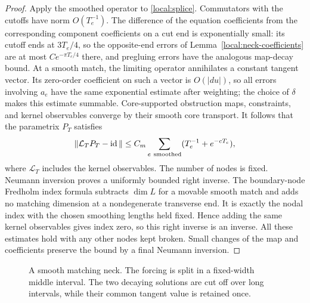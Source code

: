 \begin{proof}
Apply the smoothed operator to \eqref{local:splice}.  Commutators with
the cutoffs have norm $O(T_e^{-1})$.  The difference of the equation
coefficients from the corresponding component coefficients on a
cut end is exponentially small: its cutoff ends at $3T_e/4$, so the
opposite-end errors of Lemma~\ref{local:neck-coefficients} are at most
$Ce^{-\pi T_e/4}$ there, and pregluing errors have the analogous
map-decay bound.  At a smooth match, the limiting operator annihilates
a constant tangent vector.  Its zero-order coefficient on such a
vector is $O(|du|)$, so all errors involving $a_e$ have the same
exponential estimate after weighting; the choice of $\delta$ makes
this estimate summable.  Core-supported obstruction maps, constraints,
and kernel observables converge by their smooth core transport.
It follows that the parametrix $P_T$ satisfies
\begin{equation}\label{local:parametrix-error}
 \|\mathcal L_TP_T-\operatorname{id}\|
   \leq C_m\sum_{e\ \mathrm{smoothed}}
                      (T_e^{-1}+e^{-cT_e}),
\end{equation}
where $\mathcal L_T$ includes the kernel observables.  The number of
nodes is fixed.  Neumann inversion proves a uniformly bounded right
inverse.  The boundary-node Fredholm index formula subtracts
$\dim L$ for a movable smooth match and adds no matching dimension
at a nondegenerate transverse end.  It is exactly the nodal index
with the chosen smoothing lengths held fixed.  Hence adding the
same kernel observables gives index zero, so this right inverse is
an inverse.  All these estimates hold with any other nodes kept
broken.  Small changes of the map and coefficients preserve the
bound by a final Neumann inversion.
\end{proof}

\begin{figure}[ht]
\centering
{}
\caption{A smooth matching neck.  The forcing is split in a fixed-width
middle interval.  The two decaying solutions are cut off over long
intervals, while their common tangent value is retained once.}
\label{local:neck-figure}
\end{figure}

